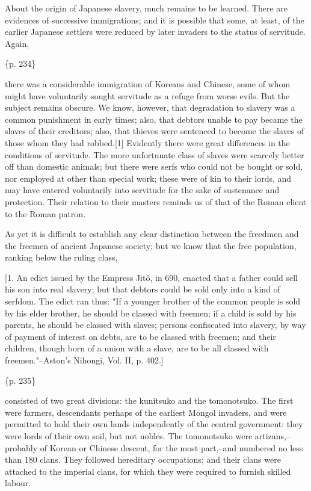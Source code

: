 About the origin of Japanese slavery, much remains to be learned. There are evidences of successive immigrations; and it is possible that some, at least, of the earlier Japanese settlers were reduced by later invaders to the status of servitude. Again,

\{p. 234\}

there was a considerable immigration of Koreans and Chinese, some of whom might have voluntarily sought servitude as a refuge from worse evils. But the subject remains obscure. We know, however, that degradation to slavery was a common punishment in early times; also, that debtors unable to pay became the slaves of their creditors; also, that thieves were sentenced to become the slaves of those whom they had robbed.[1] Evidently there were great differences in the conditions of servitude. The more unfortunate class of slaves were scarcely better off than domestic animals; but there were serfs who could not be bought or sold, nor employed at other than special work; these were of kin to their lords, and may have entered voluntarily into servitude for the sake of sustenance and protection. Their relation to their masters reminds us of that of the Roman client to the Roman patron.

As yet it is difficult to establish any clear distinction between the freedmen and the freemen of ancient Japanese society; but we know that the free population, ranking below the ruling class,

[1. An edict issued by the Empress Jitô, in 690, enacted that a father could sell his son into real slavery; but that debtors could be sold only into a kind of serfdom. The edict ran thus: "If a younger brother of the common people is sold by his elder brother, he should be classed with freemen; if a child is sold by his parents, he should be classed with slaves; persons confiscated into slavery, by way of payment of interest on debts, are to be classed with freemen; and their children, though born of a union with a slave, are to be all classed with freemen."--Aston's Nihongi, Vol. II, p. 402.]

\{p. 235\}

consisted of two great divisions: the kunitsuko and the tomonotsuko. The first were farmers, descendants perhaps of the earliest Mongol invaders, and were permitted to hold their own lands independently of the central government: they were lords of their own soil, but not nobles. The tomonotsuko were artizans,--probably of Korean or Chinese descent, for the most part,--and numbered no less than 180 clans. They followed hereditary occupations; and their clans were attached to the imperial clans, for which they were required to furnish skilled labour.

